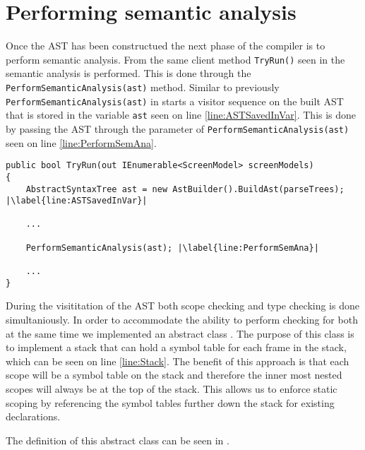 \section{Performing semantic analysis}

Once the AST has been constructued the next phase of the compiler is to perform semantic analysis. From the same client method \texttt{TryRun()} seen in  the semantic analysis is performed. This is done through the \texttt{PerformSemanticAnalysis(ast)} method. 
Similar to previously \texttt{PerformSemanticAnalysis(ast)} in  starts a visitor sequence on the built AST that is stored in the variable \texttt{ast} seen on line \ref{line:ASTSavedInVar}. This is done by passing the AST through the parameter of \texttt{PerformSemanticAnalysis(ast)} seen on line \ref{line:PerformSemAna}.

\begin{lstlisting}[language=CSharp, caption={The Run method that serves as a client inside the DazelCompiler class}, label={lst:RunMethodSecond},escapechar=|]
public bool TryRun(out IEnumerable<ScreenModel> screenModels)
{
    AbstractSyntaxTree ast = new AstBuilder().BuildAst(parseTrees); |\label{line:ASTSavedInVar}|

    ...
    
    PerformSemanticAnalysis(ast); |\label{line:PerformSemAna}|

    ...
}
\end{lstlisting}

During the visititation of the AST both scope checking and type checking is done simultaniously. 
In order to accommodate the ability to perform checking for both at the same time we implemented an abstract class \abstractsemanticclass{}. The purpose of this class is to implement a stack that can hold a symbol table for each frame in the stack, which can be seen on line \ref{line:Stack}. The benefit of this approach is that each scope will be a symbol table on the stack and therefore the inner most nested scopes will always be at the top of the stack. This allows us to enforce static scoping by referencing the symbol tables further down the stack for existing declarations.

The definition of this abstract class can be seen in .

